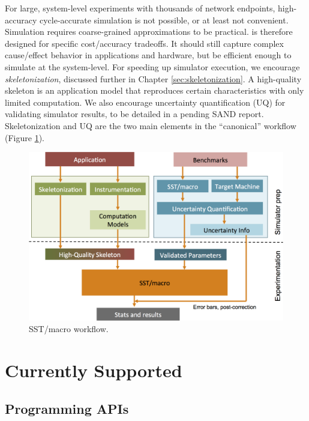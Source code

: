 For large, system-level experiments with thousands of network endpoints, high-accuracy cycle-accurate simulation is not possible,
or at least not convenient.
Simulation requires coarse-grained approximations to be practical.
\sstmacro is therefore designed for specific cost/accuracy tradeoffs.
It should still capture complex cause/effect behavior in applications and hardware, but be efficient enough to simulate at the system-level. 
For speeding up simulator execution, we encourage \textit{skeletonization}, discussed further in Chapter \ref{sec:skeletonization}. 
A high-quality skeleton is an application model that reproduces certain characteristics with only limited computation.  
We also encourage uncertainty quantification (UQ) for validating simulator results,
to be detailed in a pending SAND report.  
Skeletonization and UQ are the two main elements in the ``canonical'' \sstmacro workflow (Figure \ref{fig:workflow}).

\begin{figure}[t]
  \centering
    \includegraphics[width=0.99\columnwidth]{figures/workflow.png}
      \caption{SST/macro workflow.}
      \label{fig:workflow}
\end{figure}

\section{Currently Supported}
\label{sec:intro:supported}

\subsection{Programming APIs}
\label{subsec:intro:apis}

